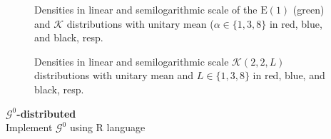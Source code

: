 \documentclass{article}
\begin{document}
\begin{figure}[hbt]
\centering
{}
\caption[Densities in linear and semilogarithmic scale of the $\text{E}(1)$ (green) and $\mathcal K$ distributions]{Densities in linear and semilogarithmic scale of the $\text{E}(1)$ (green) and $\mathcal K$ distributions with unitary mean ($\alpha\in\{1,3,8\}$ in red, blue, and black, resp.}

	\centering
	\caption[Densities in linear and semilogarithmic scale $\mathcal K(2,2,L)$ distributions with unitary mean and $L\in\{1,3,8\}$]{Densities in linear and semilogarithmic scale $\mathcal K(2,2,L)$ distributions with unitary mean and $L\in\{1,3,8\}$ in red, blue, and black, resp.}
\end{figure}
\textbf{$\mathcal G^0$-distributed} \\
Implement $\mathcal G^0$ using R language \\
\end{document}
